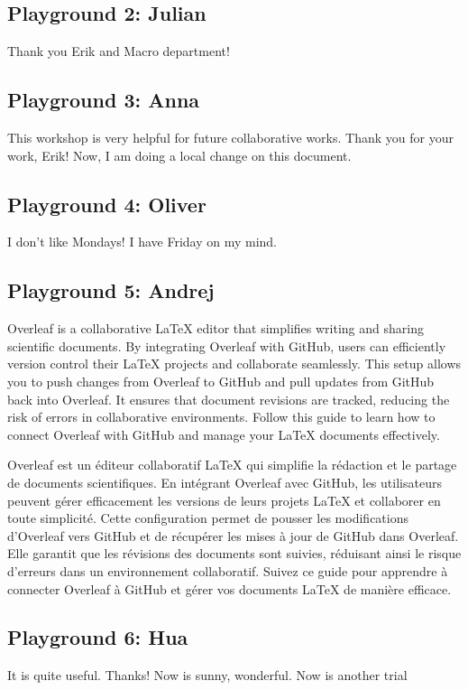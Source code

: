 \documentclass{article}
\begin{document}
\subsection{Playground 2: Julian}
Thank you Erik and Macro department!

\subsection{Playground 3: Anna}
This workshop is very helpful for future collaborative works. Thank you for your work, Erik!
Now, I am doing a local change on this document.

\subsection{Playground 4: Oliver}
I don't like Mondays!
I have Friday on my mind.

\subsection{Playground 5: Andrej}
Overleaf is a collaborative LaTeX editor that simplifies writing and sharing scientific documents. By integrating Overleaf with GitHub, users can efficiently version control their LaTeX projects and collaborate seamlessly. This setup allows you to push changes from Overleaf to GitHub and pull updates from GitHub back into Overleaf. It ensures that document revisions are tracked, reducing the risk of errors in collaborative environments. Follow this guide to learn how to connect Overleaf with GitHub and manage your LaTeX documents effectively.

Overleaf est un éditeur collaboratif LaTeX qui simplifie la rédaction et le partage de documents scientifiques. En intégrant Overleaf avec GitHub, les utilisateurs peuvent gérer efficacement les versions de leurs projets LaTeX et collaborer en toute simplicité. Cette configuration permet de pousser les modifications d’Overleaf vers GitHub et de récupérer les mises à jour de GitHub dans Overleaf. Elle garantit que les révisions des documents sont suivies, réduisant ainsi le risque d’erreurs dans un environnement collaboratif. Suivez ce guide pour apprendre à connecter Overleaf à GitHub et gérer vos documents LaTeX de manière efficace.

\subsection{Playground 6: Hua}
It is quite useful. Thanks!
Now is sunny, wonderful.
Now is another trial
\end{document}
